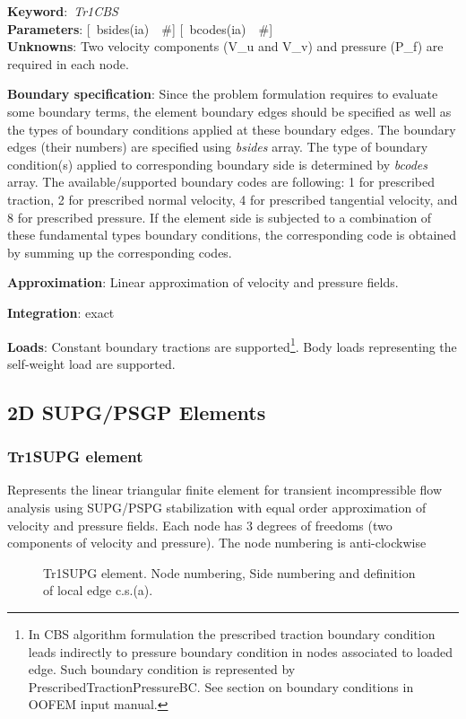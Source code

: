 \documentclass[12pt,dvips]{article}
\newcommand{\descitem}[1]{{\noindent \bf #1}:}
\newcommand{\elemkeyword}[1]{\descitem{Keyword}~{\em #1}}
\newcommand{\elemparam}[2]{{{#1\tiny (#2)}~~\#}}
\newcommand{\optelemparam}[2]{{[~\elemparam{#1}{#2}]}}
\newcommand{\param}[1]{{\it #1}}
\begin{document}
\elemkeyword{Tr1CBS}\\
\descitem{Parameters} \optelemparam{bsides}{ia} \optelemparam{bcodes}{ia}\\
\descitem{Unknowns}
Two velocity components (V\_u and V\_v) and pressure (P\_f) are required in each node.

\descitem{Boundary specification}
Since the problem formulation requires to evaluate some boundary terms,
the element boundary edges should be specified as well as the types of
boundary conditions applied at these boundary edges. The boundary
edges (their numbers) are specified using \param{bsides} array. The
type of boundary condition(s) applied to corresponding boundary side
is determined by \param{bcodes} array. The available/supported
boundary codes are following: 1 for prescribed traction, 2 for
prescribed normal velocity, 4 for prescribed tangential velocity, and
8 for prescribed pressure. If the element side is subjected to a
combination of these fundamental types boundary conditions, the
corresponding code is obtained by summing up the corresponding codes.

\descitem{Approximation} Linear approximation of velocity and pressure
fields.

\descitem{Integration}
exact

\descitem{Loads} Constant boundary tractions are supported\footnote{In CBS algorithm formulation the prescribed traction
boundary condition leads indirectly to pressure boundary condition in
nodes associated to loaded edge. Such boundary condition is
represented by PrescribedTractionPressureBC. See section on boundary
conditions in OOFEM input manual.}. Body loads
representing the self-weight load are supported.

\subsection{2D SUPG/PSGP Elements}
\subsubsection{Tr1SUPG element}
\label{Tr1SUPG}
Represents the linear triangular finite element for transient
incompressible flow analysis using SUPG/PSPG stabilization with equal order
approximation of velocity and pressure fields. Each node has 3 degrees
of freedoms (two components of velocity and pressure).
The node numbering is anti-clockwise

\begin{figure}[tb]
\begin{center}\end{center}
\caption{Tr1SUPG element. Node numbering, Side numbering and
definition of local edge c.s.(a).}
\label{Tr1SUPG2fig}
\end{figure}
\end{document}
